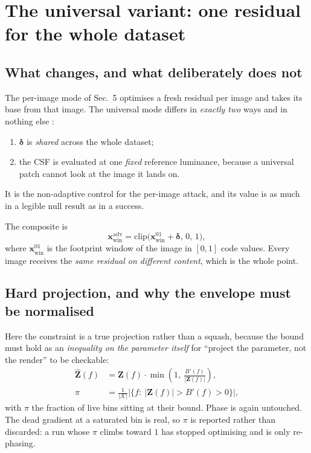 \documentclass[11pt,a4paper]{article}
\begin{document}
\section{The universal variant: one residual for the whole dataset}

\subsection{What changes, and what deliberately does not}

The per-image mode of Sec.~5 optimises a fresh residual per image and takes
its base from that image. The universal mode differs in \emph{exactly two}
ways and in nothing else \citep[cf.][]{moosavi2017universal}:
\begin{enumerate}
\item $\boldsymbol{\delta}$ is \emph{shared} across the whole dataset;
\item the CSF is evaluated at one \emph{fixed} reference luminance, because
  a universal patch cannot look at the image it lands on.
\end{enumerate}
It is the non-adaptive control for the per-image attack, and its value is as
much in a legible null result as in a success.

The composite is
\begin{equation}
  \mathbf{x}^{\mathrm{adv}}_{\mathrm{win}}
  = \mathrm{clip}\big(\mathbf{x}^{01}_{\mathrm{win}}
    + \boldsymbol{\delta},\,0,\,1\big),
  \label{eq:univcomposite}
\end{equation}
where $\mathbf{x}^{01}_{\mathrm{win}}$ is the footprint window of the image
in $[0,1]$ code values. Every image receives the \emph{same residual on
different content}, which is the whole point.

\subsection{Hard projection, and why the envelope must be normalised}
\label{sec:univproj}

Here the constraint is a true projection rather than a squash, because the
bound must hold as an \emph{inequality on the parameter itself} for
``project the parameter, not the render'' to be checkable:
\begin{align}
  \widehat{\mathbf{Z}}(f)
    &= \mathbf{Z}(f)\cdot\min\!\left(1,\
       \frac{B'(f)}{|\mathbf{Z}(f)|}\right), \label{eq:project}\\
  \pi &= \frac{1}{|\mathcal{K}|}\Big|\Big\{f:\
       |\mathbf{Z}(f)|>B'(f)>0\Big\}\Big| ,
  \label{eq:atbound}
\end{align}
with $\pi$ the fraction of live bins sitting at their bound. Phase is again
untouched. The dead gradient at a saturated bin is real, so $\pi$ is
reported rather than discarded: a run whose $\pi$ climbs toward $1$ has
stopped optimising and is only re-phasing.
\end{document}
